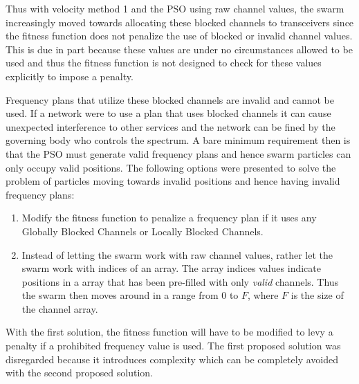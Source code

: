 Thus with velocity method 1 and the PSO using raw channel values, the swarm increasingly moved towards allocating these blocked channels to transceivers since the fitness function does not penalize the use of blocked or invalid channel values. This is due in part because these values are under no circumstances allowed to be used and thus the fitness function is not designed to check for these values explicitly to impose a penalty.

Frequency plans that utilize these blocked channels are invalid and cannot be used. If a network were to use a plan that uses blocked channels it can cause unexpected interference to other services and the network can be fined by the governing body who controls the spectrum. A bare minimum requirement then is that the PSO must generate valid frequency plans and hence swarm particles can only occupy valid positions. The following options were presented to solve the problem of particles moving towards invalid positions and hence having invalid frequency plans:
\begin{enumerate}
\item Modify the fitness function to penalize a frequency plan if it uses any Globally Blocked Channels or Locally Blocked Channels.
\item Instead of letting the swarm work with raw channel values, rather let the swarm work with indices of an array. The array indices values indicate positions in a array that has been pre-filled with only \emph{valid} channels. Thus the swarm then moves around in a range from 0 to $F$, where $F$ is the size of the channel array.
\end{enumerate}

With the first solution, the fitness function will have to be modified to levy a penalty if a prohibited frequency value is used. The first proposed solution was disregarded because it introduces complexity which can be completely avoided with the second proposed solution.

